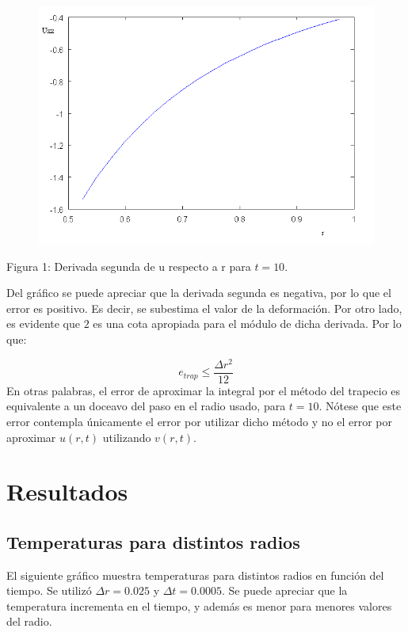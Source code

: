 ﻿\documentclass[%
final,
%
reprint,
%
notitlepage,
narroweqnarray,
inline,
twoside,
invited
]{ieee}
\begin{document}
\begin{figure}[H]
	\begin{center}
	\includegraphics[scale=0.33]{./img/uxx.png}
	\end{center}
\end{figure}
\begin{center}
\par Figura 1: Derivada segunda de u respecto a r para $t=10$.
\end{center}

Del gráfico se puede apreciar que la derivada segunda es negativa, por lo que el error es positivo. Es decir, 
se subestima el valor de la deformación. Por otro lado, es evidente que $2$ es una cota apropiada para el 
módulo de dicha derivada. Por lo que:

\[
e_{trap} \leq \frac{\Delta r^2}{12}
\]
En otras palabras, el error de aproximar la integral por el método del trapecio es equivalente a un doceavo 
del paso en el radio usado, para $t=10$. Nótese que este error contempla únicamente el error por utilizar 
dicho método y no el error por aproximar $u(r,t)$ utilizando $v(r,t)$.

\section{Resultados}

\subsection{Temperaturas para distintos radios}

El siguiente gráfico muestra temperaturas para distintos radios en función del tiempo. Se utilizó $\Delta r = 0.025$ 
y $\Delta t = 0.0005$. Se puede apreciar que la temperatura incrementa en el tiempo, y además es menor 
para menores valores del radio.
\end{document}

